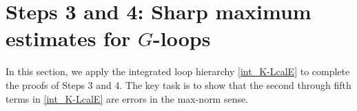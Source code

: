 
 

 

 
\section{Steps 3 and 4: Sharp maximum estimates for \texorpdfstring{$G$}{G}-loops}\label{Sec:Steps34}


In this section, we apply the integrated loop hierarchy \eqref{int_K-LcalE} to complete the proofs of Steps 3 and 4. The key task is to show that the second through fifth terms in \eqref{int_K-LcalE} are errors in the max-norm sense.

